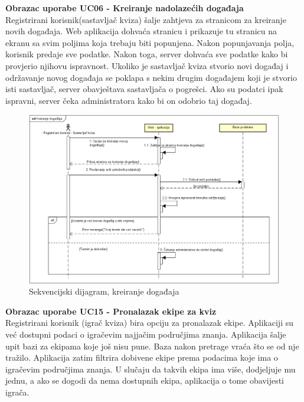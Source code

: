 				\textbf{Obrazac uporabe UC06 - Kreiranje nadolazećih događaja}\\
				
				Registrirani korisnik(sastavljač kviza) šalje zahtjeva za stranicom za kreiranje novih događaja. Web aplikacija dohvaća stranicu i prikazuje tu stranicu na ekranu sa svim poljima koja trebaju biti popunjena. Nakon popunjavanja polja, korisnik predaje sve podatke. Nakon toga, server dohvaća sve podatke kako bi provjerio njihovu ispravnost. Ukoliko je sastavljač kviza stvorio novi događaj i održavanje novog događaja se poklapa s nekim drugim događajem koji je stvorio isti sastavljač, server obavještava sastavljača o pogrešci. Ako su podatci ipak ispravni, server čeka administratora kako bi on odobrio taj događaj.
				
				\begin{figure}[H]
					\includegraphics[width=\textwidth]{dijagrami/SeqDiagram2.PNG} 
					\caption{Sekvencijski dijagram, kreiranje događaja}
					\label{fig:SeqDiagram2}
				\end{figure}
				
				\eject
				
				\textbf{Obrazac uporabe UC15 - Pronalazak ekipe za kviz}\\
				
				Registrirani korisnik (igrač kviza) bira opciju za pronalazak ekipe. Aplikaciji su već dostupni podaci o igračevim najjačim područjima znanja. Aplikacija šalje upit bazi za ekipama koje još nisu pune. Baza nakon pretrage vraća što se od nje tražilo. Aplikacija zatim filtrira dobivene ekipe prema podacima koje ima o igračevim područjima znanja. U slučaju da takvih ekipa ima više, dodjeljuje mu jednu, a ako se dogodi da nema dostupnih ekipa, aplikacija o tome obavijesti igrača.
				

